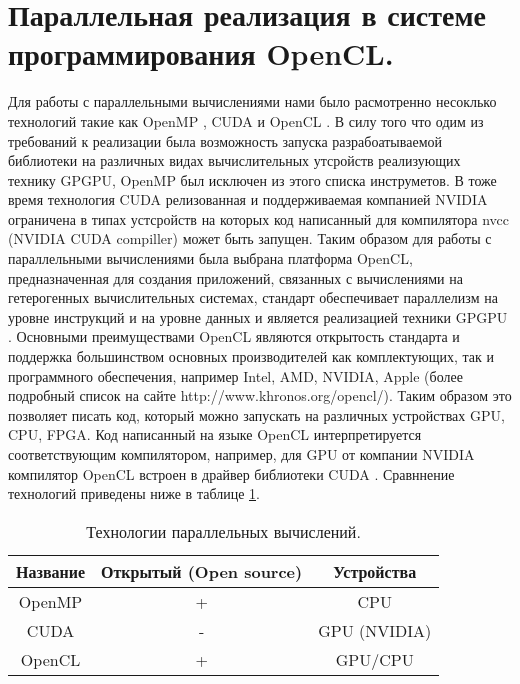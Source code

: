 \section{Параллельная реализация в системе программирования OpenCL.}\label{sec:ch3/sect4}

Для работы с параллельными вычислениями нами было расмотренно несоклько технологий такие как OpenMP \cite{mattson2019openmp}, CUDA \cite{Cook2012} и OpenCL \cite{Munshi2011, Stone2010}. В силу того что одим из требований к реализации была возможность запуска разрабоатываемой библиотеки на различных видах вычислительных утсройств реализующих технику GPGPU, OpenMP был исключен из этого списка инструметов. В тоже время технология CUDA релизованная и поддерживаемая компанией NVIDIA ограничена в типах устсройств на которых код написанный для компилятора nvcc (NVIDIA CUDA compiller) может быть запущен. Таким образом для работы с параллельными вычислениями была выбрана платформа OpenCL, предназначенная для создания приложений, связанных с вычислениями на гетерогенных вычислительных системах, стандарт обеспечивает параллелизм на уровне инструкций и на уровне данных и является реализацией техники GPGPU  . Основными преимуществами OpenCL являются открытость стандарта и поддержка большинством основных производителей как комплектующих, так и программного обеспечения, например Intel, AMD, NVIDIA, Apple (более подробный список на сайте http://www.khronos.org/opencl/). Таким образом это позволяет писать код, который можно запускать на различных устройствах GPU, CPU, FPGA. Код написанный на языке OpenCL интерпретируется соответствующим  компилятором, например, для GPU от компании NVIDIA компилятор OpenCL встроен в драйвер библиотеки CUDA \cite{Cook2012}. Сравннение технологий приведены ниже в таблице \ref{tab:techCMP}.

\begin{table} [htbp]%
  \centering
  \begin{threeparttable}%
    \caption{ Технологии параллельных вычислений. }%
    \label{tab:techCMP}%
    \begin{SingleSpace}
      \begin{tabular}{| c | c | c |}
        \hline
        Название & Открытый (Open source) & Устройства   \\ \hline
        OpenMP   & +                      & CPU          \\ \hline
        CUDA     & -                      & GPU (NVIDIA) \\ \hline
        OpenCL   & +                      & GPU/CPU      \\ \hline
      \end{tabular}%
    \end{SingleSpace}
  \end{threeparttable}
\end{table}

